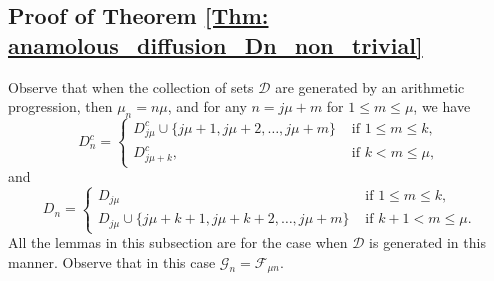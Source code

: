 \documentclass{article}
\numberwithin{equation}{section}
\newcommand{\GG}{\mbox{${\mathcal G}$}}
\newcommand{\FF}{\mbox{${\mathcal F}$}}
\newcommand{\DD}{\mbox{${\mathcal D}$}}
\newcommand{\1}{\mathbf{1}}
\newcommand{\0}{\mathbf{0}}
\begin{document}
\subsection{Proof of Theorem \ref{Thm: anamolous_diffusion_Dn_non_trivial}}
Observe that when the collection of sets $\DD$ are generated by an arithmetic progression, then $\mu_n =n \mu$, and for any $n = j \mu  +m$ for $1 \le m \le \mu $, we have 
\[
D^c_n= \begin{cases}
D^c_{j \mu } \cup \{j \mu +1, j \mu+2, \ldots, j \mu +m \} & \text{ if } 1 \le m \le k, \\
D^c_{j \mu +k}, & \text{ if } k < m \le \mu, 
\end{cases}
\]
and 
\[
D_n = \begin{cases}
D_{j \mu } & \text{ if } 1 \le m \le k, \\
D_{j \mu } \cup \{j \mu +k+1, j \mu + k +2, \ldots,j \mu  +m \} & \text{ if } k+1< m \le \mu.
\end{cases}
\]
All the lemmas in this subsection are for the case when $\DD$ is generated in this manner. Observe that in this case $\GG_n = \FF_{\mu n}$. 
\end{document}
